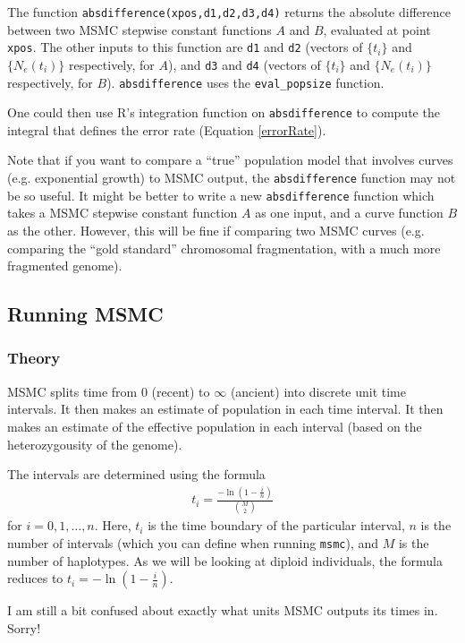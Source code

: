 \documentclass[11pt,a4paper]{article}
\begin{document}
The function \texttt{absdifference(xpos,d1,d2,d3,d4)} returns the absolute difference between two MSMC stepwise constant functions $A$ and $B$, evaluated at point \texttt{xpos}. The other inputs to this function are \texttt{d1} and \texttt{d2} (vectors of $\{t_i\}$ and $\{N_e(t_i)\}$ respectively, for $A$), and \texttt{d3} and \texttt{d4} (vectors of $\{t_i\}$ and $\{N_e(t_i)\}$ respectively, for $B$). \texttt{absdifference} uses the \texttt{eval\_popsize} function.

One could then use R's integration function on \texttt{absdifference} to compute the integral that defines the error rate (Equation \ref{errorRate}).

Note that if you want to compare a ``true''  population model that involves curves (e.g. exponential growth) to MSMC output, the \texttt{absdifference} function may not be so useful. It might be better to write a new \texttt{absdifference} function which takes a MSMC stepwise constant function $A$ as one input, and a curve function $B$ as the other. However, this will be fine if comparing two MSMC curves (e.g. comparing the ``gold standard'' chromosomal fragmentation, with a much more fragmented genome).

\subsection{Running MSMC}
\subsubsection{Theory}
MSMC splits time from 0 (recent) to $\infty$ (ancient) into discrete unit time intervals. It then makes an estimate of population in each time interval. It then makes an estimate of the effective population in each interval (based on the heterozygousity of the genome).

The intervals are determined using the formula
\begin{eqnarray}
  t_i = \frac{-\ln (1-\frac{i}{n})}{{M\choose 2}} \label{timeInts}
\end{eqnarray}
for $i = 0, 1, \dots, n$. Here, $t_i$ is the time boundary of the particular interval, $n$ is the number of intervals (which you can define when running \texttt{msmc}), and $M$ is the number of haplotypes. As we will be looking at diploid individuals, the formula reduces to $t_i = -\ln (1-\frac{i}{n})$.

I am still a bit confused about exactly what units MSMC outputs its times in. Sorry!
\end{document}
